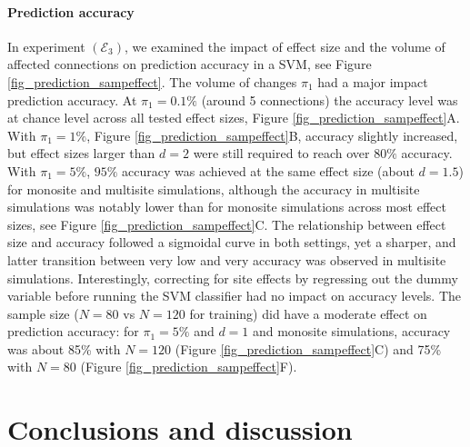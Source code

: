 \documentclass[authoryear]{elsarticle}
\begin{document}
\paragraph{Prediction accuracy}
In experiment $(\mathcal{E}_3)$, we examined the impact of effect size and the volume of affected connections on prediction accuracy in a SVM, see Figure \ref{fig_prediction_sampeffect}. The volume of changes $\pi_1$ had a major impact prediction accuracy. At $\pi_1=0.1\%$ (around 5 connections) the accuracy level was at chance level across all tested effect sizes, Figure \ref{fig_prediction_sampeffect}A. With $\pi_1=1\%$, Figure \ref{fig_prediction_sampeffect}B, accuracy slightly increased, but effect sizes larger than $d=2$ were still required to reach over $80\%$ accuracy. With $\pi_1=5\%$, $95\%$ accuracy was achieved at the same effect size (about $d=1.5$) for monosite and multisite simulations, although the accuracy in multisite simulations was notably lower than for monosite simulations across most effect sizes, see Figure \ref{fig_prediction_sampeffect}C. The relationship between effect size and accuracy followed a sigmoidal curve in both settings, yet a sharper, and latter transition between very low and very accuracy was observed in multisite simulations. Interestingly, correcting for site effects by regressing out the dummy variable before running the SVM classifier had no impact on accuracy levels. The sample size ($N=80$ vs $N=120$ for training) did have a moderate effect on prediction accuracy: for $\pi_1=5\%$ and $d=1$ and monosite simulations, accuracy was about 85\% with $N=120$ (Figure \ref{fig_prediction_sampeffect}C) and 75\% with $N=80$ (Figure \ref{fig_prediction_sampeffect}F).


\section{Conclusions and discussion}

\end{document}
